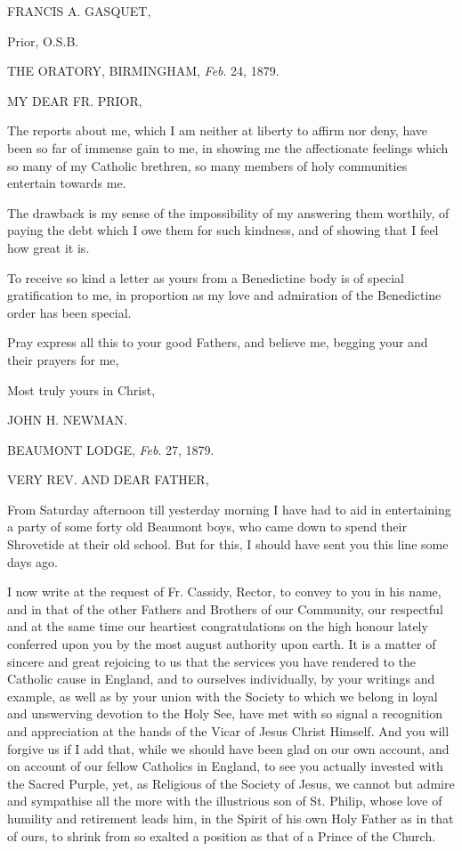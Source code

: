 FRANCIS A. GASQUET,

Prior, O.S.B.


THE ORATORY, BIRMINGHAM,
\emph{Feb}. 24, 1879.

MY DEAR FR.
PRIOR,

The reports about me, which I am neither at liberty to affirm nor
deny, have been so far of immense gain to me, in showing me the
affectionate feelings which so many of my Catholic brethren, so many
members of holy communities entertain towards me.

The drawback is my sense of the impossibility of my answering them
worthily, of paying the debt which I owe them for such kindness, and
of showing that I feel how great it is.

To receive so kind a letter as yours from a Benedictine body is of
special gratification to me, in proportion as my love and
admiration of the Benedictine order has been special.

Pray express all this to your good Fathers, and believe me, begging
your and their prayers for me,

Most truly yours in Christ,

JOHN H. NEWMAN.


BEAUMONT LODGE, \emph{Feb}.
27, 1879.

VERY REV. AND
DEAR FATHER,

From Saturday afternoon till yesterday morning I have had to aid in
entertaining a party of some forty old Beaumont boys, who came down to
spend their Shrovetide at their old school. But for this, I should
have sent you this line some days ago.

I now write at the request of Fr. Cassidy, Rector, to convey to you
in his name, and in that of the other Fathers and Brothers of our
Community, our respectful and at the same time our heartiest
congratulations on the high honour lately conferred upon you by the
most august authority upon earth. It is a matter of sincere and great
rejoicing to us that the services you have rendered to the Catholic
cause in England, and to ourselves individually, by your writings and
example, as well as by your union with the Society to which we belong
in loyal and unswerving devotion to the Holy See, have met with so
signal a recognition and appreciation at the hands of the Vicar of
Jesus Christ Himself. And you will forgive us if I add that, while we
should have been glad on our own account, and on account of our fellow
Catholics in England, to see you actually invested with the Sacred
Purple, yet, as Religious of the Society of Jesus, we cannot but
admire and sympathise all the more with the illustrious son of St.
Philip, whose love of humility and retirement leads him, in the Spirit
of his own Holy Father as in that of ours, to shrink from so exalted a
position as that of a Prince of the Church.


